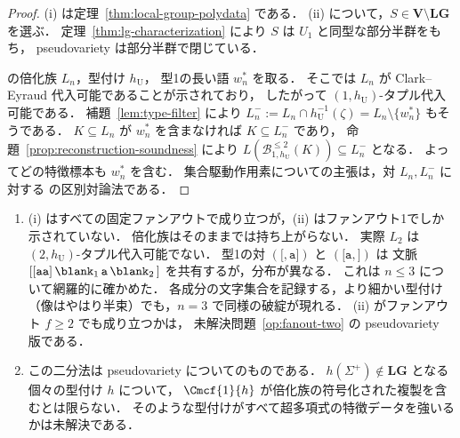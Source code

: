 \begin{proof}
(i) は定理~\ref{thm:local-group-polydata} である．
(ii) について，$S\in\mathbf V\setminus\mathbf{LG}$ を選ぶ．
定理~\ref{thm:lg-characterization} により $S$ は $U_1$ と同型な部分半群をもち，
pseudovariety は部分半群で閉じている．

\cite[Proposition~6.3]{kuriyamaCFG} の倍化族 $L_n$，型付け $h_{\mathrm U}$，
型1の長い語 $w_n^*$ を取る．
そこでは $L_n$ が Clark--Eyraud 代入可能であることが示されており，
したがって $(1,h_{\mathrm U})$-タプル代入可能である．
補題~\ref{lem:type-filter} により
$L_n^-:=L_n\cap h_{\mathrm U}^{-1}(\zeta)=L_n\setminus\{w_n^*\}$ もそうである．
$K\subseteq L_n$ が $w_n^*$ を含まなければ $K\subseteq L_n^-$ であり，
命題~\ref{prop:reconstruction-soundness} により
$L(\mathcal B^{\le2}_{1,h_{\mathrm U}}(K))\subseteq L_n^-$ となる．
よってどの特徴標本も $w_n^*$ を含む．
集合駆動作用素についての主張は，対 $L_n,L_n^-$ に対する
\cite[Proposition~6.3(iv)]{kuriyamaCFG} の区別対論法である．
\end{proof}

\begin{remark}[二分法の適用範囲]
\label{rem:dichotomy-scope}
\begin{enumerate}[label=\textup{(\roman*)},leftmargin=*]
\item (i) はすべての固定ファンアウトで成り立つが，(ii) はファンアウト1でしか示されていない．
倍化族はそのままでは持ち上がらない．
実際 $L_2$ は $(2,h_{\mathrm U})$-タプル代入可能でない．
型1の対 $(\mathtt[,\mathtt a\mathtt])$ と $(\mathtt[\mathtt a,\mathtt])$ は
文脈 $\mathtt{[[aa]}\,\blank_1\,\mathtt a\,\blank_2\,\mathtt]$ を共有するが，分布が異なる．
これは $n\le3$ について網羅的に確かめた．
各成分の文字集合を記録する，より細かい型付け（像はやはり半束）でも，$n=3$ で同様の破綻が現れる．
(ii) がファンアウト $f\ge2$ でも成り立つかは，
未解決問題~\ref{op:fanout-two} の pseudovariety 版である．
\item この二分法は pseudovariety についてのものである．
$h(\Sigma^+)\notin\mathbf{LG}$ となる個々の型付け $h$ について，
$\Cmcf{1}{h}$ が倍化族の符号化された複製を含むとは限らない．
そのような型付けがすべて超多項式の特徴データを強いるかは未解決である．
\end{enumerate}
\end{remark}
